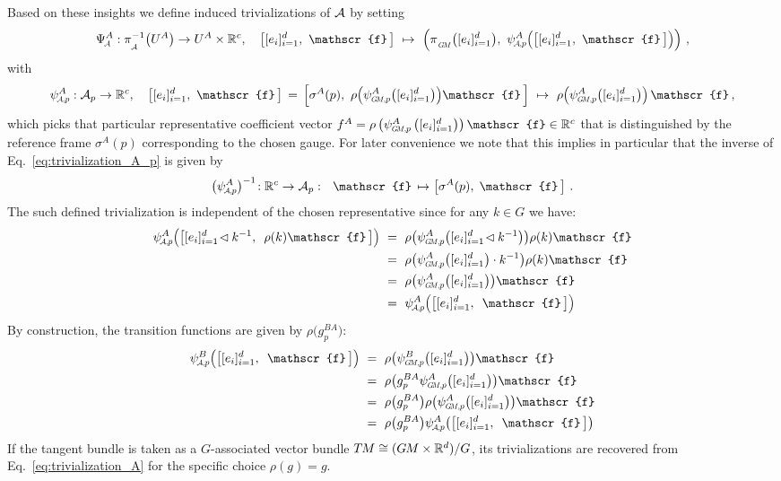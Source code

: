 Based on these insights we define induced trivializations of $\mathcal{A}$ by setting
\begin{align}\label{eq:trivialization_A}
    \PsiA^A: \piA^{-1}\big(U^A\big)\to U^A\times\R^c,\quad
    \big[[e_{i}]_{i=1}^d,\ \mathscr{f}\,\big]\ \mapsto\ 
    \Big(\piGM \big([e_{i}]_{i=1}^d \big),\ \psiAp^A \pig(\big[ [e_{i}]_{i=1}^d,\ \mathscr{f}\,\big]\pig) \Big) \ ,
\end{align}
with
\begin{align}\label{eq:trivialization_A_p}
    \psiAp^A:\A_p\to\R^c,\quad
    \big[[e_{i}]_{i=1}^d,\ \mathscr{f}\,\big]
    \, =\, \Big[\sigma^A(p),\ \rho\pig( \psiGMp^A \big([e_{i}]_{i=1}^d \big)\pig) \mathscr{f}\,\Big]
    \ \mapsto\ \rho\pig(\psiGMp^A \big([e_{i}]_{i=1}^d \big)\pig)\, \mathscr{f} \,,
\end{align}
which picks that particular representative coefficient vector
$f^A = \rho\left(\psiGMp^A \left([e_{i}]_{i=1}^d\right)\right) \mathscr{f}\in\R^c$
that is distinguished by the reference frame $\sigma^A(p)$ corresponding to the chosen gauge.
For later convenience we note that this implies in particular that the inverse of Eq.~\eqref{eq:trivialization_A_p} is given by
\begin{align}\label{eq:trivialization_A_p_inv}
    \big(\psiAp^A\big)^{-1}\!: \R^c \to \A_p:\ \ 
    \mathscr{f} \,\mapsto \big[\sigma^A(p),\; \mathscr{f}\,\big] \ .
\end{align}
The such defined trivialization is independent of the chosen representative since for any $k\in G$ we have:
\begin{align}
    \psiAp^A \pig(\big[ [e_{i}]_{i=1}^d \!\lhd k^{-1},\,\ \rho(k)\mathscr{f} \,\big]\pig)
    \ &=\ \rho\big(\psiGMp^A \big([e_{i}]_{i=1}^d \!\lhd k^{-1} \big)\big) \rho(k)\mathscr{f} \notag\\
    \ &=\ \rho\big(\psiGMp^A \big([e_{i}]_{i=1}^d \big) \cdot k^{-1}\big) \rho(k)\mathscr{f} \notag\\
    \ &=\ \rho\big(\psiGMp^A \big([e_{i}]_{i=1}^d \big)\big) \mathscr{f} \notag\\
    \ &=\ \psiAp^A \pig(\big[ [e_{i}]_{i=1}^d,\,\ \mathscr{f}\,\big]\pig)
\end{align}
By construction, the transition functions are given by $\rho\big(g_p^{BA}\big)$:
\begin{align}\label{eq:transition_fct_A}
    \psiAp^B \pig(\big[ [e_{i}]_{i=1}^d,\,\ \mathscr{f}\, \big]\pig)
    \ &=\ \rho\big(\psiGMp^B \big([e_{i}]_{i=1}^d \big)\big) \mathscr{f} \notag\\
    \ &=\ \rho\big(g_p^{BA}\psiGMp^A \big([e_{i}]_{i=1}^d \big)\big) \mathscr{f} \notag\\
    \ &=\ \rho\big(g_p^{BA}\big) \rho\big(\psiGMp^A \big([e_{i}]_{i=1}^d \big)\big) \mathscr{f} \notag\\
    \ &=\ \rho\big(g_p^{BA}\big) \psiAp^A \big(\big[ [e_{i}]_{i=1}^d,\,\ \mathscr{f}\,\big]\big)
\end{align}
If the tangent bundle is taken as a $G$-associated vector bundle $T\mkern-1.5muM\cong(G\mkern-1.4muM\times\mathbb{R}^d)/G$, its trivializations are recovered from Eq.~\eqref{eq:trivialization_A} for the specific choice $\rho(g)=g$.


